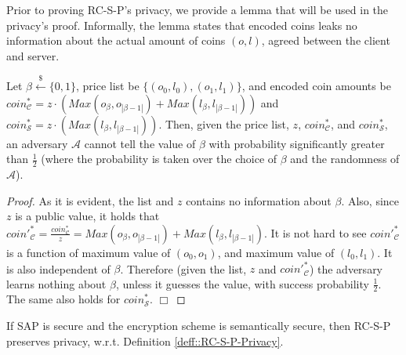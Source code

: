   
  Prior to proving  RC-S-P's privacy, we provide a lemma that will be used in the privacy's proof. Informally, the lemma states that encoded coins leaks no information about the actual amount of coins $(o,l)$, agreed between the client and server. 


\begin{lemma}\label{lemma::encoded-coins} Let $\beta\stackrel{\scriptscriptstyle\$}\leftarrow\{0,1\}$, price list be $\{(o_{\scriptscriptstyle 0},l_{\scriptscriptstyle 0}),(o_{\scriptscriptstyle 1},l_{\scriptscriptstyle 1})\}$, and encoded coin amounts be $coin^{\scriptscriptstyle *}_{\scriptscriptstyle\mathcal{C}}= z\cdot(Max(o_{\scriptscriptstyle\beta},o_{\scriptscriptstyle|\beta-1|})+Max(l_{\scriptscriptstyle\beta},l_{\scriptscriptstyle|\beta-1|}))$ and $coin^{\scriptscriptstyle *}_{\scriptscriptstyle\mathcal{S}}=z\cdot(Max(l_{\scriptscriptstyle\beta}, l_{\scriptscriptstyle |\beta-1|}))$. Then, given the price list, $z$, $coin^{\scriptscriptstyle *}_{\scriptscriptstyle\mathcal{C}}$, and $coin^{\scriptscriptstyle *}_{\scriptscriptstyle\mathcal{S}}$, an adversary $\mathcal{A}$ cannot tell the value of $\beta$ with probability significantly greater than $\frac{1}{2}$ (where the probability is taken over the choice of $\beta$ and the randomness of $\mathcal{A}$).
\end{lemma}



\begin{proof}
As it is evident, the list and $z$ contains no information about $\beta$. Also, since  $z$ is a public value, it holds that   $coin'^{\scriptscriptstyle *}_{\scriptscriptstyle\mathcal C}=\frac{coin^{\scriptscriptstyle *}_{\scriptscriptstyle\mathcal C}}{z} = Max(o_{\scriptscriptstyle\beta},o_{\scriptscriptstyle|\beta-1|})+Max(l_{\scriptscriptstyle\beta}, l_{\scriptscriptstyle|\beta-1|})$. It is not hard to see $coin'^{\scriptscriptstyle *}_{\scriptscriptstyle\mathcal C}$ is a function of maximum value of $(o_{\scriptscriptstyle 0},o_{\scriptscriptstyle 1})$, and maximum value of $(l_{\scriptscriptstyle 0},l_{\scriptscriptstyle 1})$. It is also  independent of $\beta$. Therefore (given the list, $z$ and $coin'^{\scriptscriptstyle *}_{\scriptscriptstyle\mathcal C}$) the adversary learns nothing about $\beta$, unless it guesses the value,  with  success probability $\frac{1}{2}$. The same also holds for $coin^{\scriptscriptstyle *}_{\scriptscriptstyle\mathcal S}$. 
 \hfill\(\Box\)\end{proof}


\begin{lemma}\label{lem::RC-S-P-Privacy} If SAP is secure and the encryption scheme is semantically secure, then RC-S-P preserves privacy, w.r.t. Definition \ref{deff::RC-S-P-Privacy}. 
\end{lemma}

